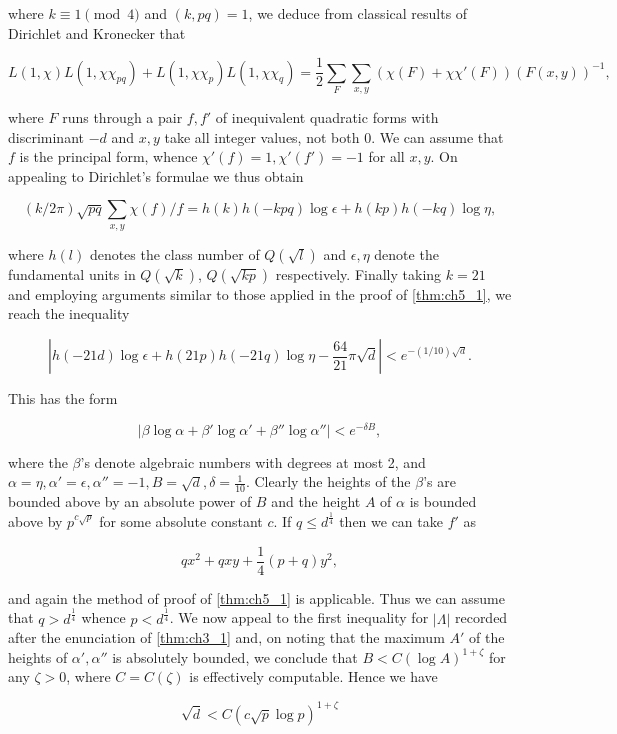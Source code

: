 where $k \equiv 1 \pmod 4$ and $(k, pq) = 1$, we deduce from classical results of Dirichlet and Kronecker that

\[ L(1,\chi)L(1,\chi\chi_{pq}) + L(1,\chi\chi_p)L(1,\chi\chi_q) = \frac{1}{2} \sum_F \sum_{x,y} (\chi(F) + \chi\chi'(F))(F(x,y))^{-1}, \]

where $F$ runs through a pair $f, f'$ of inequivalent quadratic forms with discriminant $-d$ and $x, y$ take all integer values, not both 0. We can assume that $f$ is the principal form, whence $\chi'(f) = 1, \chi'(f') = -1$ for all $x, y$. On appealing to Dirichlet's formulae we thus obtain

\[(k/2\pi)\sqrt{pq}\sum_{x,y}\chi(f)/f=h(k)h(-kpq)\log\epsilon+h(kp)h(-kq)\log\eta,\]

where $h(l)$ denotes the class number of $Q(\sqrt{l})$ and $\epsilon, \eta$ denote the fundamental units in $Q(\sqrt{k})$, $Q(\sqrt{kp})$ respectively. Finally taking $k=21$ and employing arguments similar to those applied in the proof of \autoref{thm:ch5_1}, we reach the inequality

\[|h(-21d)\log \epsilon + h(21p)h(-21q)\log \eta - \frac{64}{21}\pi\sqrt{d}| < e^{-(1/10)\sqrt{d}}.\]

This has the form

\[\left|\beta\log\alpha+\beta'\log\alpha'+\beta''\log\alpha''\right|< e^{-\delta B},\]

where the $\beta$'s denote algebraic numbers with degrees at most 2, and $\alpha = \eta, \alpha' = \epsilon, \alpha'' = -1, B = \sqrt{d}, \delta = \frac{1}{10}$. Clearly the heights of the $\beta$'s are bounded above by an absolute power of $B$ and the height $A$ of $\alpha$ is bounded above by $p^{c\sqrt{p}}$ for some absolute constant $c$. If $q \le d^{\frac{1}{4}}$ then we can take $f'$ as

\[ qx^2 + qxy + \frac{1}{4}(p+q)y^2, \]

and again the method of proof of \autoref{thm:ch5_1} is applicable. Thus we can assume that $q > d^{\frac{1}{4}}$ whence $p < d^{\frac{1}{4}}$. We now appeal to the first inequality for $|\Lambda|$ recorded after the enunciation of \autoref{thm:ch3_1} and, on noting that the maximum $A'$ of the heights of $\alpha', \alpha''$ is absolutely bounded, we conclude that $B < C(\log A)^{1+\zeta}$ for any $\zeta > 0$, where $C = C(\zeta)$ is effectively computable. Hence we have

\[\sqrt{d} < C(c\sqrt{p}\log p)^{1+\zeta}\]

